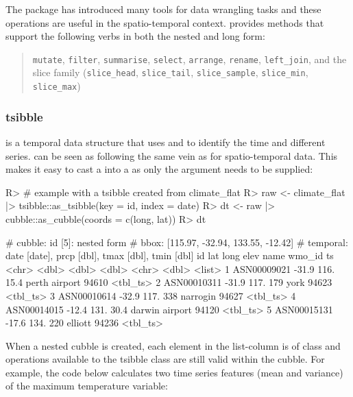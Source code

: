 \documentclass[
]{jss}
\begin{document}
The  package has introduced many tools for data wrangling tasks and these operations are useful in the spatio-temporal context.  provides methods that support the following  verbs in both the nested and long form:

\begin{quote}
\texttt{mutate}, \texttt{filter}, \texttt{summarise}, \texttt{select}, \texttt{arrange}, \texttt{rename}, \texttt{left\_join}, and the slice family (\texttt{slice\_head}, \texttt{slice\_tail}, \texttt{slice\_sample}, \texttt{slice\_min}, \texttt{slice\_max})
\end{quote}

\hypertarget{tsibble}{%
\subsubsection{tsibble}\label{tsibble}}

 is a temporal data structure that uses  and  to identify the time and different series.  can be seen as following the same vein as  for spatio-temporal data. This makes it easy to cast a  into a  as only the  argument needs to be supplied:

\begin{CodeChunk}
\begin{CodeInput}
R> # example with a tsibble created from climate_flat
R> raw <- climate_flat |> tsibble::as_tsibble(key = id, index = date)
R> dt <-  raw |> cubble::as_cubble(coords = c(long, lat))
R> dt
\end{CodeInput}
\begin{CodeOutput}
# cubble:   id [5]: nested form
# bbox:     [115.97, -32.94, 133.55, -12.42]
# temporal: date [date], prcp [dbl], tmax [dbl], tmin [dbl]
  id            lat  long  elev name           wmo_id ts      
  <chr>       <dbl> <dbl> <dbl> <chr>           <dbl> <list>  
1 ASN00009021 -31.9  116.  15.4 perth airport   94610 <tbl_ts>
2 ASN00010311 -31.9  117. 179   york            94623 <tbl_ts>
3 ASN00010614 -32.9  117. 338   narrogin        94627 <tbl_ts>
4 ASN00014015 -12.4  131.  30.4 darwin airport  94120 <tbl_ts>
5 ASN00015131 -17.6  134. 220   elliott         94236 <tbl_ts>
\end{CodeOutput}
\end{CodeChunk}

When a nested cubble is created, each element in the list-column  is of  class and operations available to the tsibble class are still valid within the cubble. For example, the code below calculates two time series features (mean and variance) of the maximum temperature variable:
\end{document}
